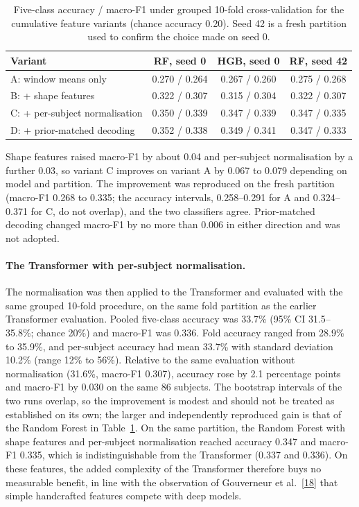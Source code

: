 \begin{table}[h]
\centering
\small
\caption{Five-class accuracy / macro-F1 under grouped 10-fold cross-validation for the cumulative feature variants (chance accuracy 0.20). Seed 42 is a fresh partition used to confirm the choice made on seed 0.}
\label{tab:fe-variants}
\begin{tabular}{lccc}
\hline
\textbf{Variant} & \textbf{RF, seed 0} & \textbf{HGB, seed 0} & \textbf{RF, seed 42} \\
\hline
A: window means only & 0.270 / 0.264 & 0.267 / 0.260 & 0.275 / 0.268 \\
B: + shape features & 0.322 / 0.307 & 0.315 / 0.304 & 0.322 / 0.307 \\
C: + per-subject normalisation & 0.350 / 0.339 & 0.347 / 0.339 & 0.347 / 0.335 \\
D: + prior-matched decoding & 0.352 / 0.338 & 0.349 / 0.341 & 0.347 / 0.333 \\
\hline
\end{tabular}
\end{table}

Shape features raised macro-F1 by about 0.04 and per-subject normalisation by a further 0.03, so variant C improves on variant A by 0.067 to 0.079 depending on model and partition. The improvement was reproduced on the fresh partition (macro-F1 0.268 to 0.335; the accuracy intervals, 0.258--0.291 for A and 0.324--0.371 for C, do not overlap), and the two classifiers agree. Prior-matched decoding changed macro-F1 by no more than 0.006 in either direction and was not adopted.

\paragraph{The Transformer with per-subject normalisation.} The normalisation was then applied to the Transformer and evaluated with the same grouped 10-fold procedure, on the same fold partition as the earlier Transformer evaluation. Pooled five-class accuracy was 33.7\% (95\% CI 31.5--35.8\%; chance 20\%) and macro-F1 was 0.336. Fold accuracy ranged from 28.9\% to 35.9\%, and per-subject accuracy had mean 33.7\% with standard deviation 10.2\% (range 12\% to 56\%). Relative to the same evaluation without normalisation (31.6\%, macro-F1 0.307), accuracy rose by 2.1 percentage points and macro-F1 by 0.030 on the same 86 subjects. The bootstrap intervals of the two runs overlap, so the improvement is modest and should not be treated as established on its own; the larger and independently reproduced gain is that of the Random Forest in Table~\ref{tab:fe-variants}. On the same partition, the Random Forest with shape features and per-subject normalisation reached accuracy 0.347 and macro-F1 0.335, which is indistinguishable from the Transformer (0.337 and 0.336). On these features, the added complexity of the Transformer therefore buys no measurable benefit, in line with the observation of Gouverneur et al.\ \hyperlink{ref18}{[18]} that simple handcrafted features compete with deep models.

